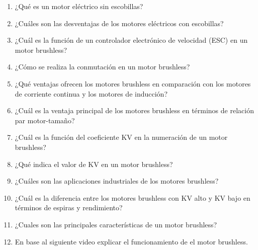 \documentclass[../main]{subfiles}
\begin{document}
\begin{enumerate}
\item ¿Qué es un motor eléctrico sin escobillas?
\item ¿Cuáles son las desventajas de los motores eléctricos con escobillas?
\item ¿Cuál es la función de un controlador electrónico de velocidad (ESC) en un motor brushless?
\item ¿Cómo se realiza la conmutación en un motor brushless?
\item ¿Qué ventajas ofrecen los motores brushless en comparación con los motores de corriente continua y los motores de inducción?
\item ¿Cuál es la ventaja principal de los motores brushless en términos de relación par motor-tamaño?
\item ¿Cuál es la función del coeficiente KV en la numeración de un motor brushless?
\item ¿Qué indica el valor de KV en un motor brushless?
\item ¿Cuáles son las aplicaciones industriales de los motores brushless?
\item ¿Cuál es la diferencia entre los motores brushless con KV alto y KV bajo en términos de espiras y rendimiento?
\item ¿Cuales son las principales características de un motor brushless?
    \item En base al siguiente video explicar el funcionamiento de el motor brushless.
\end{enumerate}
\end{document}
